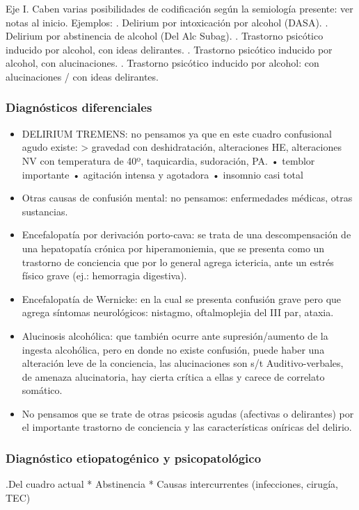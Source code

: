 \documentclass[encares.tex]{subfiles}
\begin{document}
Eje I. Caben varias posibilidades de codificación según la semiología presente: ver notas al inicio. Ejemplos: . Delirium por intoxicación por alcohol (DASA). . Delirium por abstinencia de alcohol (Del Alc Subag). . Trastorno psicótico inducido por alcohol, con ideas delirantes. . Trastorno psicótico inducido por alcohol, con alucinaciones. . Trastorno psicótico inducido por alcohol: con alucinaciones / con ideas delirantes.

\subsubsection*{Diagnósticos diferenciales}
\begin{itemize}
\item DELIRIUM TREMENS: no pensamos ya que en este cuadro confusional agudo existe: > gravedad con deshidratación, alteraciones HE, alteraciones NV con temperatura de 40º, taquicardia, sudoración, PA. • temblor importante • agitación intensa y agotadora • insomnio casi total
\item Otras causas de confusión mental: no pensamos: enfermedades médicas, otras sustancias.
\item Encefalopatía por derivación porto-cava: se trata de una descompensación de una hepatopatía crónica por hiperamoniemia, que se presenta como un trastorno de conciencia que por lo general agrega ictericia, ante un estrés físico grave (ej.: hemorragia digestiva).
\item Encefalopatía de Wernicke: en la cual se presenta confusión grave pero que agrega síntomas neurológicos: nistagmo, oftalmoplejia del III par, ataxia.
\item Alucinosis alcohólica: que también ocurre ante supresión/aumento de la ingesta alcohólica, pero en donde no existe confusión, puede haber una alteración leve de la conciencia, las alucinaciones son s/t Auditivo-verbales, de amenaza alucinatoria, hay cierta crítica a ellas y carece de correlato somático.
\item No pensamos que se trate de otras psicosis agudas (afectivas o delirantes) por el importante trastorno de conciencia y las características oníricas del delirio.
\end{itemize}
\subsubsection*{Diagnóstico etiopatogénico y psicopatológico}

.Del cuadro actual
* Abstinencia
* Causas intercurrentes (infecciones, cirugía, TEC)
\end{document}
